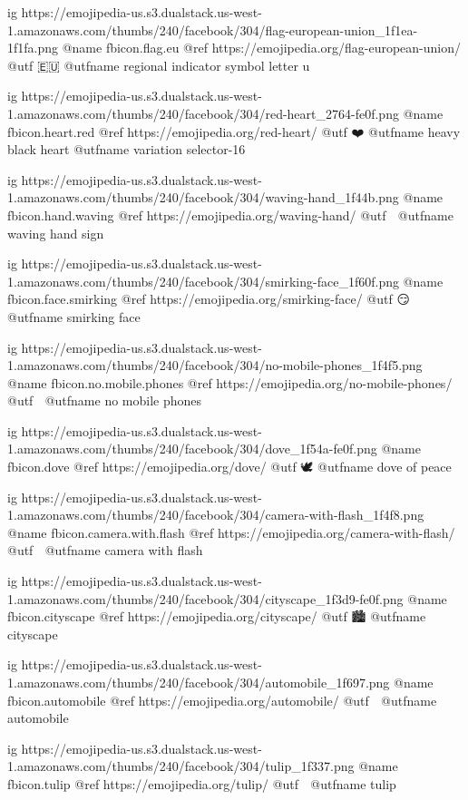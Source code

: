   ig https://emojipedia-us.s3.dualstack.us-west-1.amazonaws.com/thumbs/240/facebook/304/flag-european-union_1f1ea-1f1fa.png
  @name fbicon.flag.eu
  @ref https://emojipedia.org/flag-european-union/
  @utf 🇪🇺
  @utfname regional indicator symbol letter u

  ig https://emojipedia-us.s3.dualstack.us-west-1.amazonaws.com/thumbs/240/facebook/304/red-heart_2764-fe0f.png
  @name fbicon.heart.red
  @ref https://emojipedia.org/red-heart/
  @utf ❤️
  @utfname heavy black heart 
  @utfname variation selector-16

  ig https://emojipedia-us.s3.dualstack.us-west-1.amazonaws.com/thumbs/240/facebook/304/waving-hand_1f44b.png
  @name fbicon.hand.waving
  @ref https://emojipedia.org/waving-hand/
  @utf 👋
  @utfname waving hand sign

  ig https://emojipedia-us.s3.dualstack.us-west-1.amazonaws.com/thumbs/240/facebook/304/smirking-face_1f60f.png
  @name fbicon.face.smirking
  @ref https://emojipedia.org/smirking-face/
  @utf 😏
  @utfname smirking face

  ig https://emojipedia-us.s3.dualstack.us-west-1.amazonaws.com/thumbs/240/facebook/304/no-mobile-phones_1f4f5.png
  @name fbicon.no.mobile.phones
  @ref https://emojipedia.org/no-mobile-phones/
  @utf 📵
  @utfname no mobile phones

  ig https://emojipedia-us.s3.dualstack.us-west-1.amazonaws.com/thumbs/240/facebook/304/dove_1f54a-fe0f.png
  @name fbicon.dove
  @ref https://emojipedia.org/dove/
  @utf 🕊️
  @utfname dove of peace

  ig https://emojipedia-us.s3.dualstack.us-west-1.amazonaws.com/thumbs/240/facebook/304/camera-with-flash_1f4f8.png
  @name fbicon.camera.with.flash
  @ref https://emojipedia.org/camera-with-flash/
  @utf 📸
  @utfname camera with flash

  ig https://emojipedia-us.s3.dualstack.us-west-1.amazonaws.com/thumbs/240/facebook/304/cityscape_1f3d9-fe0f.png
  @name fbicon.cityscape
  @ref https://emojipedia.org/cityscape/
  @utf 🏙️
  @utfname cityscape

  ig https://emojipedia-us.s3.dualstack.us-west-1.amazonaws.com/thumbs/240/facebook/304/automobile_1f697.png
  @name fbicon.automobile
  @ref https://emojipedia.org/automobile/
  @utf 🚗
  @utfname automobile

  ig https://emojipedia-us.s3.dualstack.us-west-1.amazonaws.com/thumbs/240/facebook/304/tulip_1f337.png
  @name fbicon.tulip
  @ref https://emojipedia.org/tulip/
  @utf 🌷
  @utfname tulip
  
